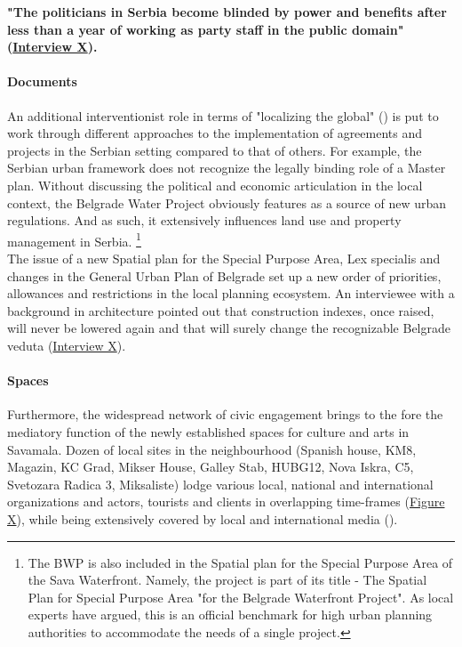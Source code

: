 \documentclass[11pt]{report}
\begin{document}
{{{{\textbf{"The politicians in Serbia become blinded by power and benefits after less   than a year of working as party staff in the public domain" 
(\href{InterviewX}{Interview X}).}

\paragraph{Documents}

An additional interventionist role in terms of "localizing the global" (\href{Latour}{\citealt{latour_reassembling_2005}}) is put to work through different approaches to the implementation of agreements and projects in the Serbian setting compared to that of others. For example, the Serbian urban framework does not recognize the legally binding role of a Master plan. Without discussing the political and economic articulation in the local context, the Belgrade Water Project obviously features as a source of new urban regulations. And as such, it extensively influences land use and property management in Serbia.
\footnote
{The BWP is also included in the Spatial plan for the Special Purpose Area of the Sava Waterfront. Namely, the project is part of its title - The Spatial Plan for Special Purpose Area "for the Belgrade Waterfront Project". As local experts have argued, this is an official benchmark for high urban planning authorities to accommodate the needs of a single project.}
\\

The issue of a new Spatial plan for the Special Purpose Area, Lex specialis and changes in the General Urban Plan of Belgrade set up a new order of priorities, allowances and restrictions in the local planning ecosystem. An interviewee with a background in architecture pointed out that construction indexes, once raised, will never be lowered again and that will surely change the recognizable Belgrade veduta (\href{InterviewX}{Interview X}).

\paragraph{Spaces}

Furthermore, the widespread network of civic engagement brings to the fore the mediatory function of the newly established spaces for culture and arts in Savamala. Dozen of local sites in the neighbourhood (Spanish house, KM8, Magazin, KC Grad, Mikser House, Galley Stab, HUBG12, Nova Iskra, C5, Svetozara Radica 3, Miksaliste) lodge various local, national and international organizations and actors,  tourists  and clients in overlapping time-frames (\href{ref}{Figure X}),
while being extensively covered by local and international media
(\cite{add references from media sources archive}).
\\

}}}}
\end{document}
